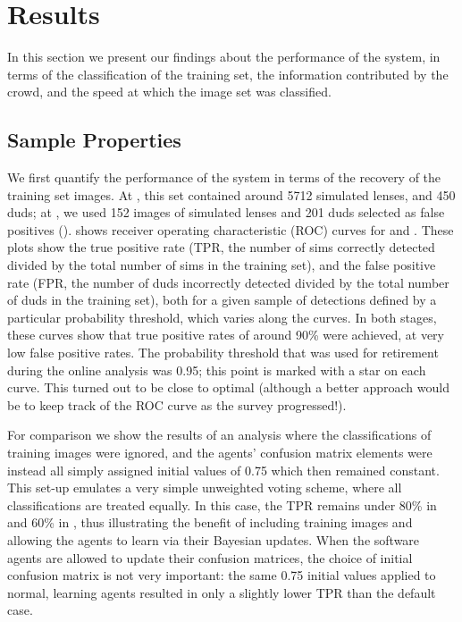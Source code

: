 \documentclass[useAMS,usenatbib,a4paper]{mn2e}
\begin{document}

\section{Results}
\label{sec:results}

In this section we present our findings about the performance of the \SW system,
in terms of the classification of the training set, the  information contributed
by the crowd, and the speed at which the image set was classified.


\subsection{Sample Properties}
\label{sec:results:sample}

We first quantify the performance of the \SW system in terms of the recovery of
the training set images. At \StageOne, this set contained around 5712 simulated
lenses, and 450 duds; at \StageTwo, we used 152 images of simulated lenses and
201 duds selected as \StageOne false positives ().
 shows receiver operating characteristic (ROC)
curves for \cfhtls \StageOne and \StageTwo. These plots show the true positive
rate (TPR, the number of sims correctly detected divided by the total number of
sims in the training set), and the false positive rate (FPR, the number of duds
incorrectly detected  divided by the total number of duds in the training set), both
for a given sample of detections defined by a particular probability threshold,
which varies along the curves.  In both stages, these curves show that true
positive rates of  around 90\% were achieved, at very low false positive rates.
The probability threshold that was used for retirement during the \StageOne online analysis
was 0.95; this point is marked with a star on each curve.
This turned out to be close to optimal (although a better approach would be to
keep track of the ROC curve as the survey progressed!).

For comparison we show the results of an analysis where the classifications of
training images were ignored, and the agents' confusion matrix elements
were instead all simply assigned initial values of 0.75
which then remained constant. This set-up emulates a
very simple unweighted voting scheme, where all classifications are treated
equally.  In this case, the TPR remains under 80\% in \StageOne and 60\% in
\StageTwo, thus illustrating the benefit of including training images and
allowing the agents to learn via their Bayesian updates.
When the software agents are allowed to update their confusion matrices, the choice of
initial confusion matrix is not very important: the same 0.75 initial values
applied to normal, learning agents resulted in only a slightly lower TPR than
the default case.
\end{document}
